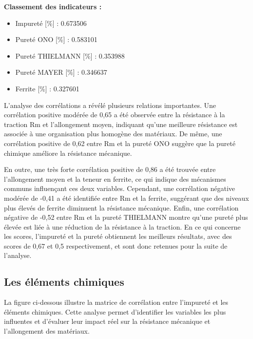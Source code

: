 \documentclass[12pt]{article}
\begin{document}
\begin{center}
    \textbf{Classement des indicateurs :}
    \vspace{0.3cm} %
    \begin{itemize}
        \item Impureté [\%] : 0.673506
        \item Pureté ONO [\%] : 0.583101
        \item Pureté THIELMANN [\%] : 0.353988
        \item Pureté MAYER [\%] : 0.346637
        \item Ferrite [\%] : 0.327601
    \end{itemize}
\end{center}






L'analyse des corrélations a révélé plusieurs relations importantes. 
Une corrélation positive modérée de 0,65 a été observée entre la résistance
à la traction Rm et l'allongement moyen, indiquant qu'une meilleure 
résistance est associée à une organisation plus homogène des matériaux. 
De même, une corrélation positive de 0,62 entre Rm et la pureté ONO 
suggère que la pureté chimique améliore la résistance mécanique.

En outre, une très forte corrélation positive de 0,86 a été trouvée entre 
l'allongement moyen et la teneur en ferrite, ce qui indique des mécanismes 
communs influençant ces deux variables. Cependant, une corrélation 
négative modérée de -0,41 a été identifiée entre Rm et la ferrite, 
suggérant que des niveaux plus élevés de ferrite diminuent la résistance 
mécanique. Enfin, une corrélation négative de -0,52 entre Rm et la pureté 
THIELMANN montre qu'une pureté plus élevée est liée à une réduction de 
la résistance à la traction. En ce qui concerne les scores, l'impureté 
et la pureté obtiennent les meilleurs résultats, avec des scores de 0,67 
et 0,5 respectivement, et sont donc retenues pour la suite de l'analyse.


\subsection{Les éléments chimiques}



La figure ci-dessous illustre la matrice de corrélation entre l'impureté 
et les éléments chimiques. Cette analyse permet d'identifier les 
variables les plus influentes et d'évaluer leur impact réel sur 
la résistance mécanique et l'allongement des matériaux.
\end{document}
